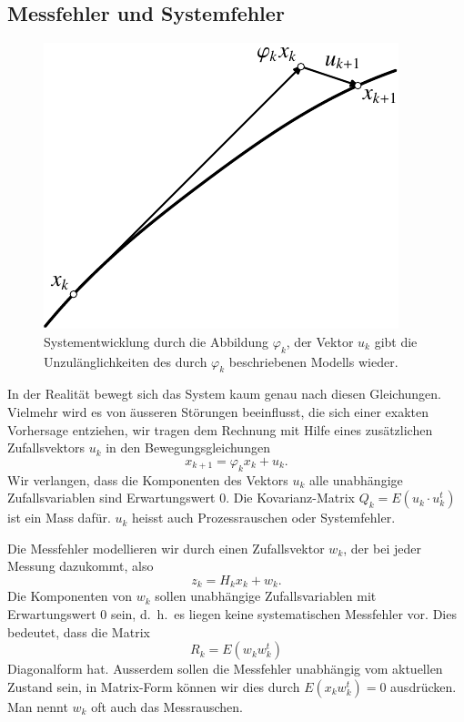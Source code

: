 \subsection{Messfehler und Systemfehler}
\begin{figure}
\centering
\includegraphics{images/filter-1.pdf}
\caption{Systementwicklung durch die Abbildung $\varphi_k$, der Vektor $u_k$
gibt die Unzulänglichkeiten des durch $\varphi_k$ beschriebenen Modells
wieder.
\label{filter-systementwicklung}}
\end{figure}
In der Realität bewegt sich das System kaum genau nach diesen Gleichungen.
Vielmehr wird es von äusseren Störungen beeinflusst, die sich einer
exakten Vorhersage entziehen, wir tragen dem Rechnung mit Hilfe eines
zusätzlichen Zufallsvektors $u_k$ in den Bewegungsgleichungen
\[
x_{k+1}=\varphi_kx_k+ u_k.
\]
Wir verlangen, dass die Komponenten des Vektors $u_k$ alle unabhängige
Zufallsvariablen sind Erwartungswert 0.
Die Kovarianz-Matrix $Q_k=E(u_k\cdot u_k^t)$ ist
ein Mass dafür.
$u_k$ heisst auch Prozessrauschen oder Systemfehler.

Die Messfehler modellieren wir durch einen
Zufallsvektor $w_k$, der bei jeder Messung dazukommt, also
\[
z_k=H_kx_k+w_k.
\]
Die Komponenten von $w_k$ sollen unabhängige Zufallsvariablen mit
Erwartungswert $0$ sein, d.~h.~es liegen keine systematischen Messfehler
vor.
Dies bedeutet, dass die Matrix
\[
R_k=E(w_kw_k^t)
\]
Diagonalform hat.
Ausserdem sollen die Messfehler unabhängig vom aktuellen Zustand
sein, in Matrix-Form können wir dies durch $E(x_kw_k^t)=0$ ausdrücken.
Man nennt $w_k$ oft auch das Messrauschen.

